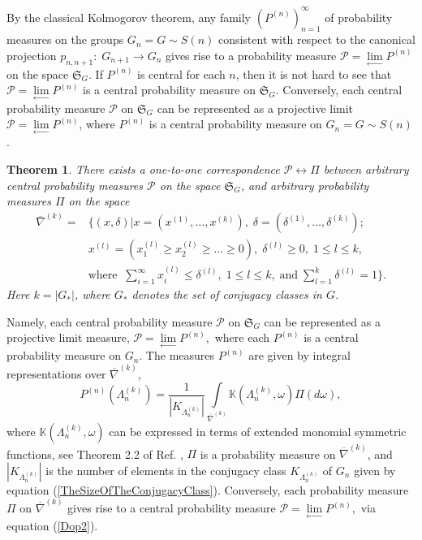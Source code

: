 \documentclass[12pt]{amsart}
\newtheorem{thm}{Theorem}[section]
\theoremstyle{definition}
\numberwithin{equation}{section}
\begin{document}
By the classical Kolmogorov theorem, any family $\left(P^{(n)}\right)_{n=1}^{\infty}$ of probability measures on the groups $G_n=G\sim S(n)$ consistent with respect to the canonical projection $p_{n,n+1}:\; G_{n+1}\longrightarrow G_n$ gives rise to a probability measure $\mathcal{P}=\underset{\longleftarrow}{\lim}P^{(n)}$
on the space $\mathfrak{S}_{G}$. If $P^{(n)}$ is central for each $n$, then it is not hard to see that
$\mathcal{P}=\underset{\longleftarrow}{\lim}P^{(n)}$ is a central probability measure on $\mathfrak{S}_{G}$.
Conversely, each central probability measure $\mathcal{P}$ on $\mathfrak{S}_{G}$ can be represented as a projective limit $\mathcal{P}=\underset{\longleftarrow}{\lim}P^{(n)}$, where $P^{(n)}$ is a central
probability measure on $G_n=G\sim S(n)$.
\begin{thm}\label{THEOREMCENTRALMEASURES} There exists a one-to-one correspondence $\mathcal{P}\longleftrightarrow\Pi$ between arbitrary central probability measures $\mathcal{P}$ on the space $\mathfrak{S}_G$, and arbitrary probability measures $\Pi$
on the space
\begin{equation}\label{SetNabla}
\begin{split}
\overline{\nabla}^{(k)}=&\biggl\{(x,\delta)\biggr|
x=\left(x^{(1)},\ldots,x^{(k)}\right),\;
\delta=\left(\delta^{(1)},\ldots,\delta^{(k)}\right);\\
&x^{(l)}=\left(x^{(l)}_1\geq x^{(l)}_2\geq\ldots\geq 0\right),\;\delta^{(l)}\geq 0,\;
1\leq l\leq k,\\
&\mbox{where}\;\;\sum\limits_{i=1}^{\infty}x_i^{(l)}\leq\delta^{(l)},\; 1\leq l\leq k,\;\mbox{and}\;\sum\limits_{l=1}^k\delta^{(l)}=1\biggl\}.
\end{split}
\end{equation}
Here $k=\left|G_{\ast}\right|$, where $G_{\ast}$ denotes the set of conjugacy classes in $G$.
\end{thm}
Namely, each  central probability measure $\mathcal{P}$ on $\mathfrak{S}_{G}$
can be represented
as a projective limit measure,
$
\mathcal{P}=\underset{\longleftarrow}{\lim}P^{(n)},
$
where each  $P^{(n)}$ is a central probability measure on $G_n$. The measures
$P^{(n)}$ are given by  integral representations over $\overline{\nabla}^{(k)}$,
\begin{equation}\label{Dop2}
P^{(n)}\left(\Lambda_n^{(k)}\right)=\frac{1}{\left|K_{\Lambda_n^{(k)}}\right|}
\int\limits_{\overline{\nabla}^{(k)}}\mathbb{K}\left(\Lambda_n^{(k)},\omega\right)\Pi(d\omega),
\end{equation}
where $\mathbb{K}\left(\Lambda_n^{(k)},\omega\right)$ can be expressed in terms
of extended monomial symmetric functions, see Theorem 2.2 of Ref. \cite{StrahovMPS},
$\Pi$ is a probability measure on $\overline{\nabla}^{(k)}$, and $\left|K_{\Lambda_n^{(k)}}\right|$ is the number of elements in the conjugacy class
$K_{\Lambda_n^{(k)}}$ of $G_n$ given by equation (\ref{TheSizeOfTheConjugacyClass}).
Conversely, each probability measure  $\Pi$ on $\overline{\nabla}^{(k)}$ gives rise
to a central probability measure
$
\mathcal{P}=\underset{\longleftarrow}{\lim}P^{(n)},
$
via equation (\ref{Dop2}).
\end{document}
